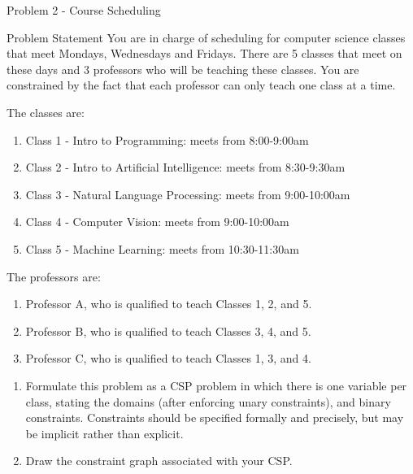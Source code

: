 \begin{problem}{Problem 2 - Course Scheduling}
    \begin{statement}{Problem Statement}
        You are in charge of scheduling for computer science classes that meet Mondays, Wednesdays and Fridays. There are 5 classes that meet on these days and 3 professors who will be teaching these 
        classes. You are constrained by the fact that each professor can only teach one class at a time.

        The classes are:

        \begin{enumerate}
            \item Class 1 - Intro to Programming: meets from 8:00-9:00am
            \item Class 2 - Intro to Artificial Intelligence: meets from 8:30-9:30am
            \item Class 3 - Natural Language Processing: meets from 9:00-10:00am
            \item Class 4 - Computer Vision: meets from 9:00-10:00am
            \item Class 5 - Machine Learning: meets from 10:30-11:30am
        \end{enumerate}

        The professors are:

        \begin{enumerate}
            \item Professor A, who is qualified to teach Classes 1, 2, and 5.
            \item Professor B, who is qualified to teach Classes 3, 4, and 5.
            \item Professor C, who is qualified to teach Classes 1, 3, and 4.
        \end{enumerate}

        \begin{enumerate}[label=\textbf{(\alph*)}]
            \item Formulate this problem as a CSP problem in which there is one variable per class, stating the domains (after enforcing unary constraints), and binary constraints. Constraints should 
            be specified formally and precisely, but may be implicit rather than explicit.
            \item Draw the constraint graph associated with your CSP.
        \end{enumerate}
    \end{statement}
    

\end{problem}
